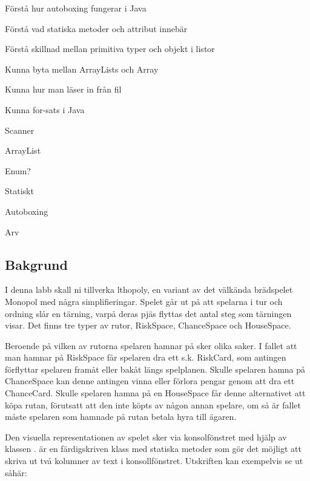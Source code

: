 

\Lab{\LabWeekELEVEN}

\begin{Goals}
\item Förstå hur autoboxing fungerar i Java
\item Förstå vad statiska metoder och attribut innebär
\item Förstå skillnad mellan primitiva typer och objekt i listor
\item Kunna byta mellan ArrayLists och Array
\item Kunna hur man läser in från fil
\item Kunna for-sats i Java
\end{Goals}

\begin{Preparations}
\item Scanner
\item ArrayList
\item Enum?
\item Statiskt
\item Autoboxing
\item Arv
\end{Preparations}

\subsection{Bakgrund}
I denna labb skall ni tillverka lthopoly, en variant av det välkända brädspelet Monopol med några simplifieringar. Spelet går ut på att spelarna i tur och ordning slår en tärning, varpå deras pjäs flyttas det antal steg som tärningen visar. Det finns tre typer av rutor, RiskSpace, ChanceSpace och HouseSpace. 

Beroende på vilken av rutorna spelaren hamnar på sker olika saker. I fallet att man hamnar på RiskSpace får spelaren dra ett s.k. RiskCard, som antingen förflyttar spelaren framåt eller bakåt längs spelplanen. 
Skulle spelaren hamna på ChanceSpace kan denne antingen vinna eller förlora pengar genom att dra ett ChanceCard. Skulle spelaren hamna på en HouseSpace får denne alternativet att köpa rutan, förutsatt att den inte köpts av någon annan spelare, om så är fallet måste spelaren som hamnade på rutan betala hyra till ägaren.

Den visuella representationen av spelet sker via konsolfönstret med hjälp av klassen .  är en färdigskriven klass med statiska metoder som gör det möjligt att skriva ut två kolumner av text i konsollfönstret. Utskriften kan exempelvis se ut såhär:

